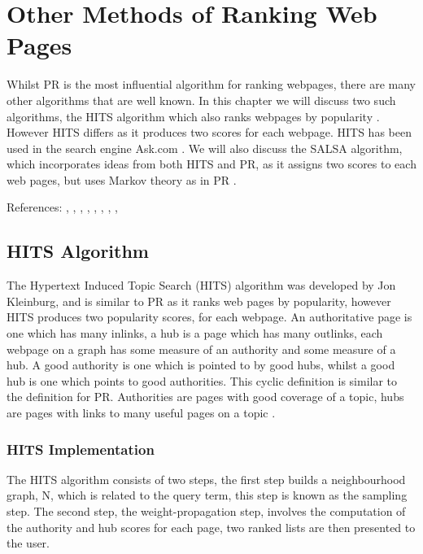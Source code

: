 \documentclass[11pt]{report}
\begin{document}
\chapter{Other Methods of Ranking Web Pages}

Whilst PR is the most influential algorithm for ranking webpages, there are many other algorithms that are well known. In this chapter we will discuss two such algorithms, the HITS algorithm which also ranks webpages by popularity \cite{kleinberg1999authoritative}. However HITS differs as it produces two scores for each webpage. HITS has been used in the search engine Ask.com \cite{bonato}. We will also discuss the SALSA algorithm, which incorporates ideas from both HITS and PR, as it assigns two scores to each web pages, but uses Markov theory as in PR \cite{lempel2000stochastic}. 


References: \cite{baldi2003modeling}, \cite{bharat1998improved}, \cite{bonato}, \cite{ding2003pagerank}, \cite{farahat2006authority}, \cite{langville}, \cite{manning}, \cite{ng2001link}, \cite{ng2001stable}

\section{HITS Algorithm}
The Hypertext Induced Topic Search (HITS) algorithm was developed by Jon Kleinburg, and is similar to PR as it ranks web pages by popularity, however HITS produces two popularity scores, for each webpage. An authoritative page is one which has many inlinks, a hub is a page which has many outlinks, each webpage on a graph has some measure of an authority and some measure of a hub. A good authority is one which is pointed to by good hubs, whilst a good hub is one which points to good authorities. This cyclic definition is similar to the definition for PR. Authorities are pages with good coverage of a topic, hubs are pages with links to many useful pages on a topic \cite{bonato}. 

\subsection{HITS Implementation}
The HITS algorithm consists of two steps, the first step builds a neighbourhood graph, N, which is related to the query term, this step is known as the sampling step. The second step, the weight-propagation step, involves the computation of the authority and hub scores for each page, two ranked lists are then presented to the user.  
\end{document}

